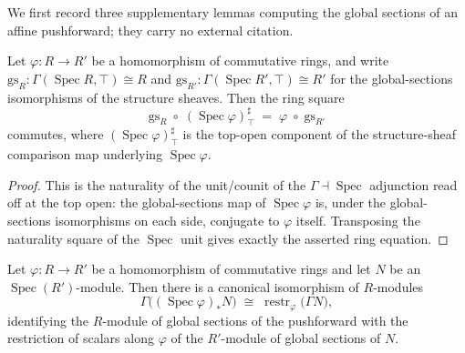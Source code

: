 We first record three supplementary lemmas computing the global sections of an
affine pushforward; they carry no external citation.

\begin{lemma}


  \label{lem:globalSectionsIso_hom_comp_specMap_appTop}
  Let \(\varphi : R \to R'\) be a homomorphism of commutative rings, and write
  \(\mathrm{gs}_R : \Gamma(\operatorname{Spec} R, \top) \cong R\) and
  \(\mathrm{gs}_{R'} : \Gamma(\operatorname{Spec} R', \top) \cong R'\) for the
  global-sections isomorphisms of the structure sheaves. Then the ring square
  \[
    \mathrm{gs}_R \;\circ\; (\operatorname{Spec}\varphi)^{\sharp}_{\top}
    \;=\; \varphi \;\circ\; \mathrm{gs}_{R'}
  \]
  commutes, where \((\operatorname{Spec}\varphi)^{\sharp}_{\top}\) is the
  top-open component of the structure-sheaf comparison map underlying
  \(\operatorname{Spec}\varphi\).
\end{lemma}

\begin{proof}



  This is the naturality of the unit/counit of the
  \(\Gamma \dashv \operatorname{Spec}\) adjunction read off at the top open: the
  global-sections map of \(\operatorname{Spec}\varphi\) is, under the
  global-sections isomorphisms on each side, conjugate to \(\varphi\) itself.
  Transposing the naturality square of the \(\operatorname{Spec}\) unit gives
  exactly the asserted ring equation.
\end{proof}

\begin{lemma}


  \label{lem:gammaPushforwardIso}
  Let \(\varphi : R \to R'\) be a homomorphism of commutative rings and let
  \(N\) be an \(\operatorname{Spec}(R')\)-module. Then there is a canonical
  isomorphism of \(R\)-modules
  \[
    \Gamma\bigl((\operatorname{Spec}\varphi)_* N\bigr)
    \;\cong\;
    \operatorname{restr}_\varphi\bigl(\Gamma N\bigr),
  \]
  identifying the \(R\)-module of global sections of the pushforward with the
  restriction of scalars along \(\varphi\) of the \(R'\)-module of global sections
  of \(N\).
\end{lemma}

